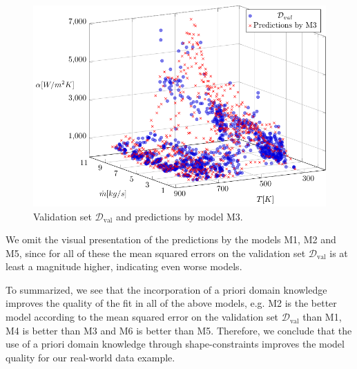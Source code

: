 \begin{figure}[H]
	\centering
	\includegraphics[width=\columnwidth]{graphics/pgfplots/cha5/M3.pdf}
	\caption{Validation set $\mathcal{D}_{\text{val}}$ and predictions by model M3.}
	\label{fig:ebner-M3}
\end{figure}

We omit the visual presentation of the predictions by the models M1, M2 and M5, since for all of these the mean squared errors on the validation set $\mathcal{D}_{\text{val}}$ is at least a magnitude higher, indicating even worse models.

To summarized, we see that the incorporation of a priori domain knowledge improves the quality of the fit in all of the above models, e.g. M2 is the better model according to the mean squared error on the validation set $\mathcal{D}_{\text{val}}$ than M1, M4 is better than M3 and M6 is better than M5. Therefore, we conclude that the use of a priori domain knowledge through shape-constraints improves the model quality for our real-world data example. 
